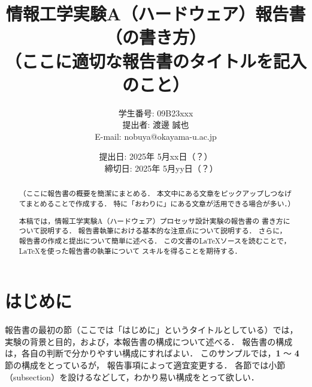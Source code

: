 \documentclass{ujarticle}[11pt]
\title{{\normalsize 情報工学実験A（ハードウェア）報告書（の書き方）}\\
    （ここに適切な報告書のタイトルを記入のこと）
    }
\author{ 
      学生番号: 09B23xxx \\
      提出者: 渡邊 誠也 \\
      E-mail: nobuya@okayama-u.ac.jp
    }
\date{
    提出日: 2025年 5月xx日（？）\\　%
    締切日: 2025年 5月yy日（？）    %
    }
\begin{document}
    \maketitle
     
     
    \begin{abstract}
    （ここに報告書の概要を簡潔にまとめる．
    本文中にある文章をピックアップしつなげてまとめることで作成する．
    特に「おわりに」にある文章が活用できる場合が多い．）
     
    本稿では，情報工学実験A（ハードウェア）プロセッサ設計実験の報告書の
    書き方について説明する．
    報告書執筆における基本的な注意点について説明する．
    さらに，報告書の作成と提出について簡単に述べる．
    この文書の\LaTeX ソースを読むことで，\LaTeX を使った報告書の執筆について
    スキルを得ることを期待する．
    \end{abstract}
     
     
    \section{はじめに}
     
    報告書の最初の節（ここでは「{\gt はじめに}」というタイトルとしている）では，
    実験の背景と目的，および，本報告書の構成について述べる．
    報告書の構成は，各自の判断で分かりやすい構成にすればよい．
    このサンプルでは，{\bf 1} 〜 {\bf 4} 節の構成をとっているが，
    報告事項によって適宜変更する．
    各節では小節（subsection）を設けるなどして，わかり易い構成をとって欲しい．
     
\end{document}
